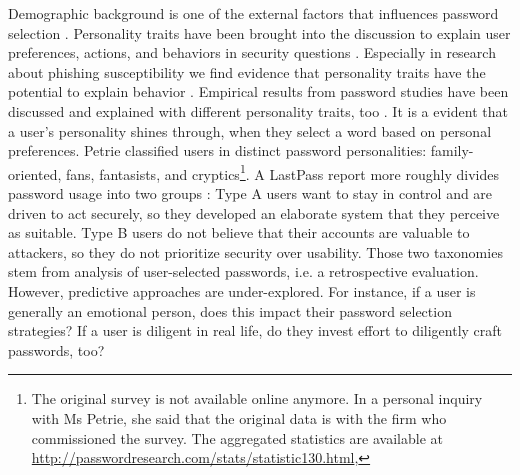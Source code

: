 Demographic background is one of the external factors that influences password selection \cite{Mazurek2013Measuring,  Violettas2014PasswordsAvoidGreece, Wang2015ChinesePWs}. Personality traits have been brought into the discussion to explain user preferences, actions, and behaviors in security questions \cite{Brown2004GeneratingPWs, Gross2016EffectCognitiveEffort, Shropshire2006PersonalityITSec, Zakaria2013DesigningEffectiveSecurityMessages}. Especially in research about phishing susceptibility we find evidence that personality traits have the potential to explain behavior \cite{Halevi2013PilotStudyPersonality,Halevi2015SpearPhishing,ParrishJr2009PersonalityPhishing,Uebelacker2014SocialEngineering}. 
Empirical results from password studies have been discussed and explained with different personality traits, too \cite{Haque2014PsychometricsStrongPassword,Weirich2001PrettyGoodPersuasion}. It is a evident that a user's personality shines through, when they select a word based on personal preferences. 
Petrie classified users in distinct password personalities: family-oriented, fans, fantasists, and cryptics\footnote{The original survey is not available online anymore. In a personal inquiry with Ms Petrie, she said that the original data is with the firm who commissioned the survey. The aggregated statistics are available at \url{http://passwordresearch.com/stats/statistic130.html}, }. A LastPass report more roughly divides password usage into two groups \cite{LastPass2016PersonalitiesGetUsHacked}: Type A users want to stay in control and are driven to act securely, so they developed an elaborate system that they perceive as suitable. Type B users do not believe that their accounts are valuable to attackers, so they do not prioritize security over usability. 
Those two taxonomies stem from analysis of user-selected passwords, i.e. a retrospective evaluation. However, predictive approaches are under-explored. For instance, if a user is generally an emotional person, does this impact their password selection strategies? If a user is diligent in real life, do they invest effort to diligently craft passwords, too? 

